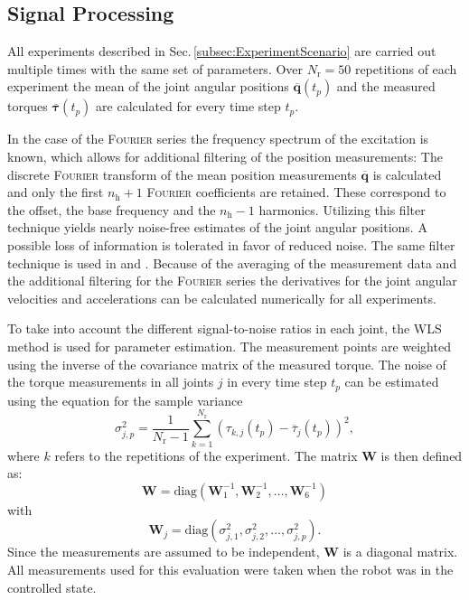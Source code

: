 \subsection{Signal Processing}
\label{subsec:SignalProcessing}
All experiments described in Sec.\,\ref{subsec:ExperimentScenario} are carried out multiple times with the same set of parameters. Over $N_\text{r}=50$ repetitions of each experiment the mean of the joint angular positions $\overline{\boldsymbol{q}}(t_p)$ and the measured torques $\overline{\boldsymbol{\tau}}(t_p)$ are calculated for every time step $t_p$. 

In the case of the \textsc{Fourier} series the frequency spectrum of the excitation is known, which allows for additional filtering of the position measurements: 
The discrete \textsc{Fourier} transform of the mean position measurements $\overline{\boldsymbol{q}}$ is calculated and only the first $n_\mathrm{h}+1$ \textsc{Fourier} coefficients are retained. These correspond to the offset, the base frequency and the $n_\mathrm{h}-1$ harmonics. Utilizing this filter technique yields nearly noise-free estimates of the joint angular positions.
A possible loss of information is tolerated in favor of reduced noise.
The same filter technique is used in \cite{Olsen.2002} and \cite{Stueckelmaier.}. 
Because of the averaging of the measurement data and the additional filtering for the \textsc{Fourier} series the derivatives for the joint angular velocities and accelerations can be calculated numerically for all experiments.


To take into account the different signal-to-noise ratios in each joint, the WLS method is used for parameter estimation. The measurement points are weighted using the inverse of the covariance matrix of the measured torque. The noise of the torque measurements in all joints $j$ in every time step $t_p$ can be estimated using the equation for the sample variance
\begin{equation}\label{eq:var_tau}
	\sigma^2_{j,p} = \frac{1}{N_\text{r}-1} \sum\limits_{k=1}^{N_\text{r}} (\tau_{k,j} (t_p) - \overline{\tau}_j(t_p))^2,
\end{equation}
where $k$ refers to the repetitions of the experiment.
The matrix $\boldsymbol{W}$ is then defined as:
\begin{equation}\label{eq:WLS_Gew}
	\boldsymbol{W} = \mathrm{diag}(\boldsymbol{W}_1^{-1}, \boldsymbol{W}_2^{-1}, \hdots, \boldsymbol{W}_6^{-1})
\end{equation}
	with
\begin{equation}
	\boldsymbol{W}_j = \mathrm{diag}(\sigma^2_{j,1}, \sigma^2_{j,2}, \hdots, \sigma^2_{j,p}).
\end{equation}
Since the measurements are assumed to be independent, $\boldsymbol{W}$ is a diagonal matrix.
All measurements used for this evaluation were taken when the robot was in the controlled state.


